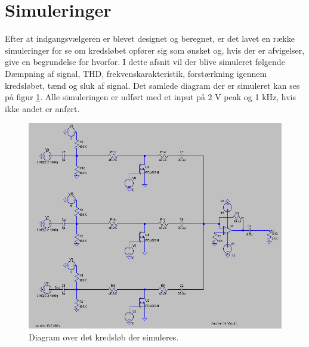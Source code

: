 \section*{Simuleringer}
Efter at indgangsvælgeren er blevet designet og beregnet, er det lavet en række simuleringer for se om kredsløbet opfører sig som ønsket og, hvis der er afvigelser, give en begrundelse for hvorfor. I dette afsnit vil der blive simuleret følgende Dæmpning af signal, THD, frekvenskarakteristik, forstærkning igennem kredsløbet, tænd og sluk af signal. Det samlede diagram der er simuleret kan ses på figur \ref{diagram_simulering}. Alle simuleringen er udført med et input på 2 V peak og 1 kHz, hvis ikke andet er anført.

\begin{figure}[h]
\centering
\includegraphics[scale=0.4]{teknisk/indgangsvaelger/simulering/indgangvaelger_ltspice_diagram.png}
\caption{Diagram over det kredsløb der simuleres.}
\label{diagram_simulering}
\end{figure}


